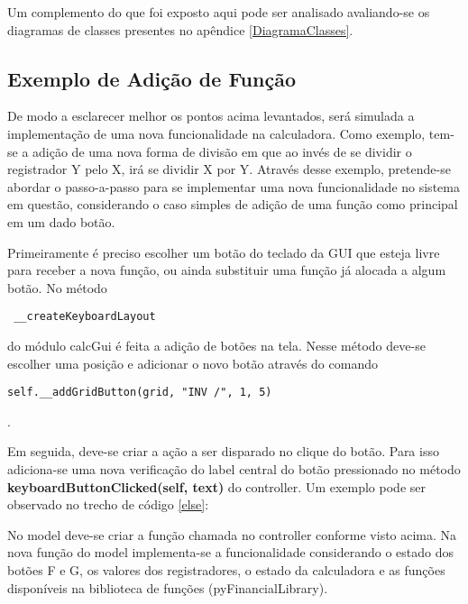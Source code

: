 Um complemento do que foi exposto aqui pode ser analisado avaliando-se os diagramas de classes presentes no apêndice \ref{DiagramaClasses}.

\subsection{Exemplo de Adição de Função}

De modo a esclarecer melhor os pontos acima levantados, será simulada a implementação de uma nova funcionalidade na calculadora. Como exemplo, tem-se a adição de uma nova forma de divisão em que ao invés de se dividir o registrador Y pelo X, irá se dividir X por Y. 
Através desse exemplo, pretende-se abordar o passo-a-passo para se implementar uma nova funcionalidade no sistema em questão, considerando o caso simples de adição de uma função como principal em um dado botão.

Primeiramente é preciso escolher um botão do teclado da GUI que esteja livre para receber a nova função, ou ainda substituir uma função já alocada a algum botão. No método \begin{verbatim} __createKeyboardLayout \end{verbatim} do módulo calcGui é feita a adição de botões na tela. Nesse método deve-se escolher uma posição e adicionar o novo botão através do comando \begin{verbatim}self.__addGridButton(grid, "INV /", 1, 5)\end{verbatim}.

Em seguida, deve-se criar a ação a ser disparado no clique do botão. Para isso adiciona-se uma nova verificação do label central do botão pressionado no método \textbf{keyboardButtonClicked(self, text)} do controller. Um exemplo pode ser observado no trecho de código \ref{else}: 



No model deve-se criar a função chamada no controller conforme visto acima. Na nova função do model implementa-se a funcionalidade considerando o estado dos botões 
F e G, os valores dos registradores, o estado da calculadora e as funções disponíveis na biblioteca de funções (pyFinancialLibrary). 

